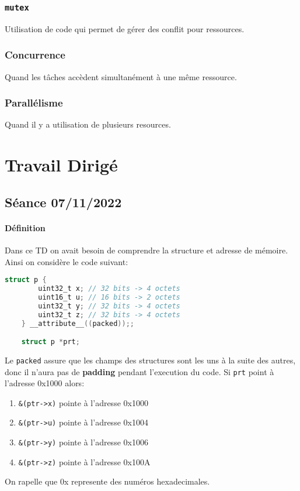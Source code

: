 \documentclass{article}
\begin{document}
\subsubsection{\texttt{mutex}}
\begin{definition}
    Utilisation de code qui permet de gérer des conflit pour ressources. 
\end{definition}

\subsubsection{Concurrence}
\begin{definition}
    Quand les tâches accèdent simultanément à une même ressource.
\end{definition}

\subsubsection{Parallélisme}
\begin{definition}
    Quand il y a utilisation de plusieurs resources.
\end{definition}


\section{Travail Dirigé}
\subsection{Séance 07/11/2022}
\paragraph{Définition}Dans ce TD on avait besoin de comprendre la structure et adresse de mémoire. Ainsi on considère le code suivant:
\begin{scriptsize}\mycode
    \begin{lstlisting}[language=C]
    struct p {
        uint32_t x; // 32 bits -> 4 octets
        uint16_t u; // 16 bits -> 2 octets
        uint32_t y; // 32 bits -> 4 octets
        uint32_t z; // 32 bits -> 4 octets
    } __attribute__((packed));;

    struct p *prt;
    \end{lstlisting}
\end{scriptsize}
Le \texttt{packed} assure que les champs des structures sont les uns à la suite des autres, donc il n'aura pas de \textbf{padding} pendant l'execution du code. Si \texttt{prt} point à l'adresse 0x1000 alors:
\begin{enumerate}[noitemsep]
    \item \texttt{\&(ptr->x)} pointe à l'adresse 0x1000
    \item \texttt{\&(ptr->u)} pointe à l'adresse 0x1004
    \item \texttt{\&(ptr->y)} pointe à l'adresse 0x1006
    \item \texttt{\&(ptr->z)} pointe à l'adresse 0x100A
\end{enumerate}
On rapelle que 0x represente des numéros hexadecimales.
\end{document}
